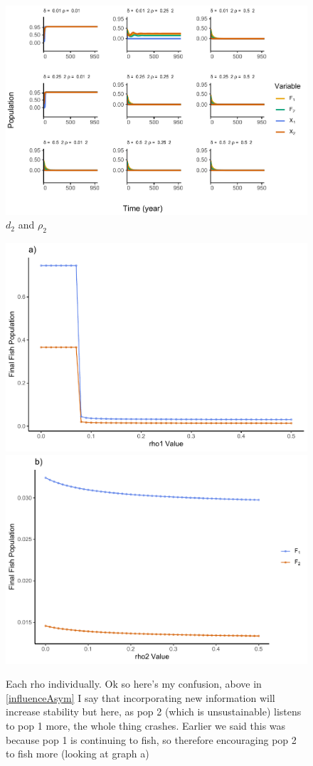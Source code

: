 \documentclass[
]{article}
\begin{document}
\begin{figure}
\centering
\includegraphics{ReviewerRhoTest_files/figure-latex/influencerho4-1.pdf}
\caption{\label{fig:influencerho4}\(d_2\) and \(\rho_2\) \label{influenceRho4}}
\end{figure}

\newpage



\begin{figure}
\includegraphics[width=0.5\linewidth]{ReviewerRhoTest_files/figure-latex/rhoExploreGraphEach-1} \includegraphics[width=0.5\linewidth]{ReviewerRhoTest_files/figure-latex/rhoExploreGraphEach-2} \caption{Each rho individually. Ok so here's my confusion, above in \ref{influenceAsym} I say that incorporating new information will increase stability but here, as pop 2 (which is unsustainable) listens to pop 1 more, the whole thing crashes. Earlier we said this was because pop 1 is continuing to fish, so therefore encouraging pop 2 to fish more (looking at graph a) \label{rhoExploreGraphEach}}\label{fig:rhoExploreGraphEach}
\end{figure}
\end{document}
